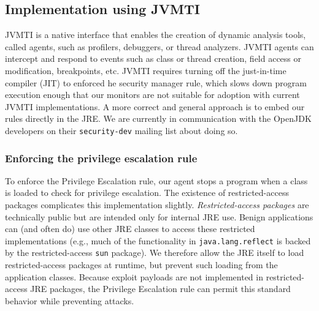 \documentclass{sig-alternate}
\newcommand{\clg}[1]{\todo[color=yellow]{CLG: #1}}
\begin{document}
\subsection{Implementation using JVMTI}\label{sub:Implementation-Using-JVMTI}

JVMTI is a native interface that enables the creation of
dynamic analysis tools, called agents, such as profilers, debuggers, or thread
analyzers. JVMTI agents can intercept and respond to events such as class
or thread creation, field access or modification, breakpoints, etc.
%
JVMTI requires turning off the just-in-time compiler (JIT) to enforced
he security manager rule, which slows down program
execution enough that our monitors are not suitable for adoption with current 
JVMTI implementations. %
A more correct and general approach is to embed our
rules directly in the JRE.  We are currently in communication 
with the OpenJDK developers on their \texttt{security-dev} mailing list about
doing so.

\subsubsection{Enforcing the privilege escalation rule}\label{sub:Enforcing-the-Privilege}


To enforce the Privilege Escalation rule, our agent stops a program when a 
class is loaded to check for privilege escalation.
The existence of restricted-access packages complicates this implementation slightly. 
\textit{Restricted-access packages} are technically public but are intended only
for internal JRE use. 
%
Benign applications can (and often do) use other JRE classes to access these
restricted implementations (e.g., much of the functionality in \texttt{java.lang.reflect}
is backed by the restricted-access \texttt{sun} package). %
We therefore allow the JRE itself to load restricted-access packages
at runtime, but prevent such loading from the application classes.
Because exploit payloads are not implemented in restricted-access JRE packages,
the Privilege Escalation rule can permit this standard behavior while preventing
attacks.  
\end{document}
